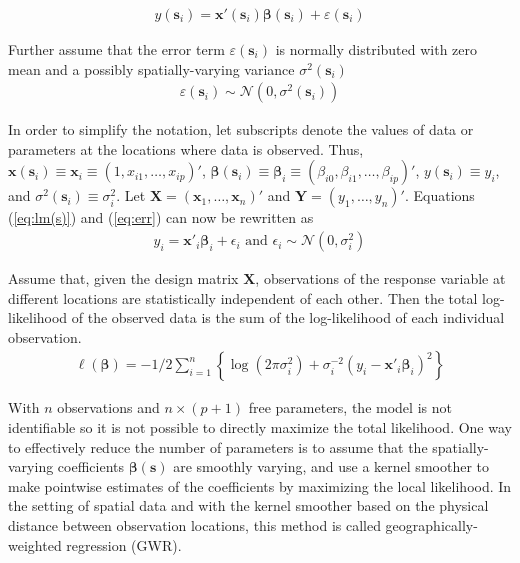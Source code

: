 \documentclass[authoryear, review, 11pt]{elsarticle}
\begin{document}
	\begin{eqnarray}
		y(\bm{s}_i) = \bm{x}'(\bm{s}_i) \bm{\beta}(\bm{s}_i) + \varepsilon(\bm{s}_i)
	\label{eq:lm(s)}
	\end{eqnarray}
	
	Further assume that the error term $\varepsilon(\bm{s}_i)$ is normally distributed with zero mean and a possibly spatially-varying variance $\sigma^2(\bm{s}_i)$
	\begin{eqnarray}
		\varepsilon(\bm{s}_i) \sim \mathcal{N} \left( 0,\sigma^2(\bm{s}_i) \right)
	\label{eq:err}
	\end{eqnarray}
	
	In order to simplify the notation, let subscripts denote the values of data or parameters at the locations where data is observed. Thus, $\bm{x}(\bm{s}_i) \equiv \bm{x}_i \equiv \left( 1, x_{i1}, \dots, x_{ip} \right)'$, $\bm{\beta}(\bm{s}_i) \equiv \bm{\beta}_i \equiv \left(\beta_{i0}, \beta_{i1}, \dots, \beta_{ip} \right)'$, $y(\bm{s}_i) \equiv y_i$, and $\sigma^2(\bm{s}_i) \equiv \sigma^2_i$. Let $\bm{X} = \left( \bm{x}_1, \dots, \bm{x}_n \right)'$ and $\bm{Y} = \left( y_1, \dots, y_n \right)'$. Equations (\ref{eq:lm(s)}) and (\ref{eq:err}) can now be rewritten as
	\begin{eqnarray}
		y_i = \bm{x}'_i \bm{\beta}_i + \epsilon_i \text{ and } \epsilon_i \sim \mathcal{N} \left( 0,\sigma_i^2 \right)
	\end{eqnarray}
	
	Assume that, given the design matrix $\bm{X}$, observations of the response variable at different locations are statistically independent of each other. Then the total log-likelihood of the observed data is the sum of the log-likelihood of each individual observation.
	 \begin{eqnarray}
	 	\ell\left( \bm{\beta} \right) = - 1/2 \sum_{i=1}^n \left\{  \log \left( 2 \pi \sigma^2_i\right) +  \sigma^{-2}_i  \left(y_i - \bm{x}'_i\bm{\beta}_i \right)^2  \right\}
	\end{eqnarray}
	
	With $n$ observations and $n \times (p+1)$ free parameters, the model is not identifiable so it is not possible to directly maximize the total likelihood. One way to effectively reduce the number of parameters is to assume that the spatially-varying coefficients $\bm{\beta}(\bm{s})$ are smoothly varying, and use a kernel smoother to make pointwise estimates of the coefficients by maximizing the local likelihood. In the setting of spatial data and with the kernel smoother based on the physical distance between observation locations, this method is called geographically-weighted regression (GWR).
		
\end{document}

